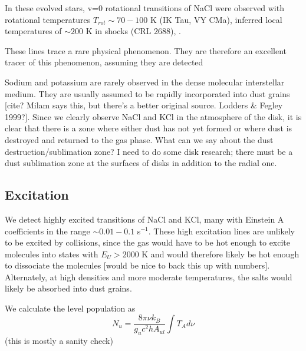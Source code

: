 \documentclass[twocolumn]{aastex62}
\begin{document}
In these evolved stars, v=0 rotational transitions of NaCl were observed
with rotational temperatures $T_{rot}\sim70-100$ K (IK Tau, VY CMa), inferred
local temperatures of $\sim200$ K in shocks (CRL 2688), .

These lines trace a rare physical phenomenon.  They are therefore an excellent tracer
of this phenomenon, assuming they are detected

Sodium and potassium are rarely observed in the dense molecular interstellar medium.
They are usually assumed to be rapidly incorporated into dust grains [cite?  Milam
says this, but there's a better original source.  Lodders \& Fegley 1999?].  Since we clearly observe NaCl
and KCl in the atmosphere of the disk, it is clear that there is a zone where either
dust has not yet formed or where dust is destroyed and returned to the gas phase.
{\color{red} What can we say about the dust destruction/sublimation zone?  I need
to do some disk research; there must be a dust sublimation zone at the surfaces
of disks in addition to the radial one.}

\subsection{Excitation}
We detect highly excited transitions of NaCl and KCl, many with Einstein A coefficients
in the range $\sim0.01-0.1$ s$^{-1}$.  These high excitation lines are unlikely
to be excited by collisions, since the gas would have to be hot enough to excite
molecules into states with $E_U > 2000$ K and would therefore likely be hot enough
to dissociate the molecules [would be nice to back this up with numbers].  Alternately,
at high densities and more moderate temperatures, the salts would likely be absorbed
into dust grains.

We calculate the level population as
\begin{equation}
    N_u = \frac{8 \pi \nu k_B}{g_u c^2 h A_{ul}} \int T_A d\nu
\end{equation}
{\color{red} (this is mostly a sanity check)}
\end{document}
